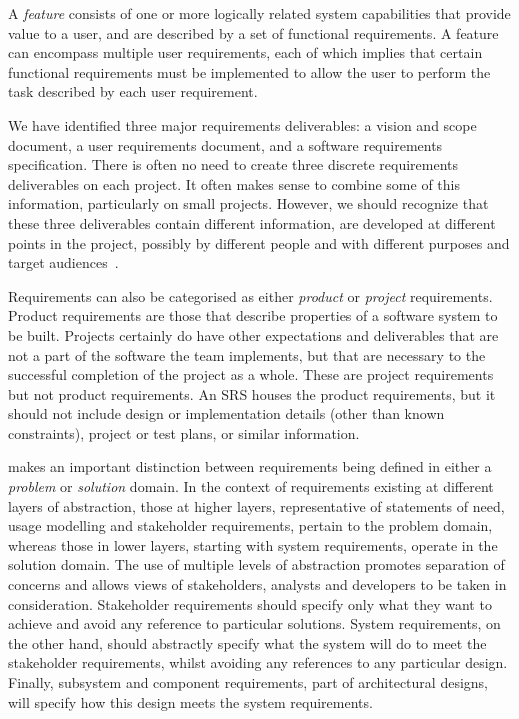 \documentclass[dissertation,final]{softeng}
\begin{document}
A \emph{feature} consists of one or more logically related system capabilities that provide value to a user, and are described by a set of functional requirements. A feature can encompass multiple user requirements, each of which implies that certain functional requirements must be implemented to allow the user to perform the task described by each user requirement. %
%

We have identified three major requirements deliverables: a vision and scope document, a user requirements document, and a software requirements specification. There is often no need to create three discrete requirements deliverables on each project. It often makes sense to combine some of this information, particularly on small projects. However, we should recognize that these three deliverables contain different information, are developed at different points in the project, possibly by different people and with different purposes and target audiences~\citep{Wiegers2013}.

Requirements can also be categorised as either \emph{product} or \emph{project} requirements. Product requirements are those that describe properties of a software system to be built. Projects certainly do have other expectations and deliverables that are not a part of the software the team implements, but that are necessary to the successful completion of the project as a whole. These are project requirements but not product requirements. An SRS houses the product requirements, but it should not include design or implementation details (other than known constraints), project or test plans, or similar information.

\citet{Hull2011} makes an important distinction between requirements being defined in either a \emph{problem} or \emph{solution} domain. In the context of requirements existing at different layers of abstraction, those at higher layers, representative of statements of need, usage modelling and stakeholder requirements, pertain to the problem domain, whereas those in lower layers, starting with system requirements, operate in the solution domain. The use of multiple levels of abstraction promotes separation of concerns and allows views of stakeholders, analysts and developers to be taken in consideration. Stakeholder requirements should specify only what they want to achieve and avoid any reference to particular solutions. System requirements, on the other hand, should abstractly specify what the system will do to meet the stakeholder requirements, whilst avoiding any references to any particular design. Finally, subsystem and component requirements, part of architectural designs, will specify how this design meets the system requirements.
\end{document}
